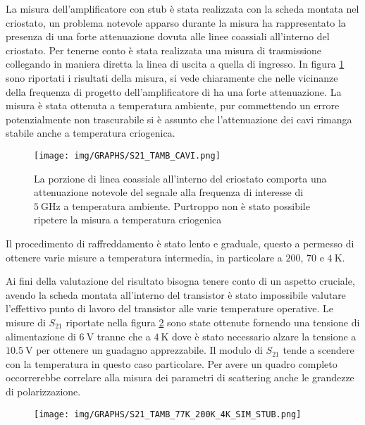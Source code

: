 \documentclass[12pt,oneside]{book}
\begin{document}
La misura dell'amplificatore con stub è stata realizzata con la scheda montata nel criostato, un problema notevole apparso durante la misura ha rappresentato la presenza di una forte attenuazione dovuta alle linee coassiali all'interno del criostato. Per tenerne conto è stata realizzata una misura di trasmissione collegando in maniera diretta la linea di uscita a quella di ingresso. In figura \ref{cables} sono riportati i risultati della misura, si vede chiaramente che nelle vicinanze della frequenza di progetto dell'amplificatore di ha una forte attenuazione. La misura è stata ottenuta a temperatura ambiente, pur commettendo un errore potenzialmente non trascurabile si è assunto che l'attenuazione dei cavi rimanga stabile anche a temperatura criogenica. 

\begin{figure}[!htbp]
    \centering
        \texttt{[image: img/GRAPHS/S21\_TAMB\_CAVI.png]}
    \caption{La porzione di linea coassiale all'interno del criostato comporta una attenuazione notevole del segnale alla frequenza di interesse di $\SI{5}{\giga\hertz}$ a temperatura ambiente. Purtroppo non è stato possibile ripetere la misura a temperatura criogenica}
    \label{cables}
\end{figure}

Il procedimento di raffreddamento è stato lento e graduale, questo a permesso di ottenere varie misure a temperatura intermedia, in particolare a $200$, $70$ e $\SI{4}{\kelvin}$.

Ai fini della valutazione del risultato bisogna tenere conto di un aspetto cruciale, avendo la scheda montata all'interno del transistor è stato impossibile valutare l'effettivo punto di lavoro del transistor alle varie temperature operative. Le misure di $S_{21}$ riportate nella figura \ref{cryo_stub_comparison} sono state ottenute fornendo una tensione di alimentazione di $\SI{6}{\volt}$ tranne che a $\SI{4}{\kelvin}$ dove è stato necessario alzare la tensione a $\SI{10.5}{\volt}$ per ottenere un guadagno apprezzabile.
Il modulo di $S_{21}$ tende a scendere con la temperatura in questo caso particolare. Per avere un quadro completo occorrerebbe correlare alla misura dei parametri di scattering anche le grandezze di polarizzazione.

\begin{figure}[!htbp]
    \centering
        \texttt{[image: img/GRAPHS/S21\_TAMB\_77K\_200K\_4K\_SIM\_STUB.png]}
    \caption{}
    \label{cryo_stub_comparison}
\end{figure}
\end{document}
